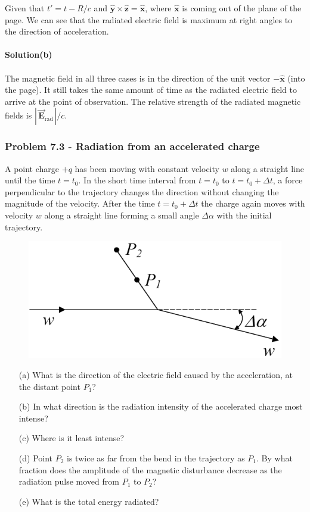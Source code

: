 \documentclass[12pt,a4paper]{article}
\begin{document}
Given that $t'=t-R/c$ and $\boldsymbol{\hat{y}}\times\boldsymbol{\hat{z}}=\boldsymbol{\hat{x}}$, where $\boldsymbol{\hat{x}}$ is coming out of the plane of the page. We can see that the radiated electric field is maximum at right angles to the direction of acceleration.
\\
\\\textbf{Solution(b)}
\\
\\The magnetic field in all three cases is in the direction of the unit vector $-\boldsymbol{\hat{x}}$ (into the page). It still takes the same amount of time as the radiated electric field to arrive at the point of observation. The relative strength of the radiated magnetic fields is $|\,\boldsymbol{\vec{E}}_{\text{rad}\,}|/c$.
 
\subsubsection*{Problem 7.3 - Radiation from an accelerated charge}
A point charge $+q$ has been moving with constant velocity $w$ along a straight line until the time $t=t_0$. In the short time interval from $t=t_0$ to $t=t_0+\Delta t$, a force perpendicular to the trajectory changes the direction without changing the magnitude of the velocity. After the time $t=t_0+\Delta t$ the charge again moves with velocity $w$ along a straight line forming a small angle $\Delta\alpha$ with the initial trajectory.
\begin{figure}[h]
    \centering
    \includegraphics[width=0.6\linewidth]{figs/fig_prob_7.3.png}
\end{figure}
\begin{enumerate}
    \item[(a)]What is the direction of the electric field caused by the acceleration, at the distant point $P_1$?
    \item[(b)] In what direction is the radiation intensity of the accelerated charge most intense?
    \item[(c)]Where is it least intense?
    \item[(d)]Point $P_2$ is twice as far from the bend in the trajectory as $P_1$. By what fraction does the amplitude of the magnetic disturbance decrease as the radiation pulse moved from $P_1$ to $P_2$?
    \item[(e)]What is the total energy radiated?
\end{enumerate}
\end{document}
